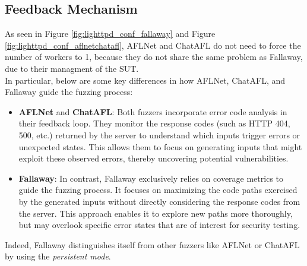 \subsection{Feedback Mechanism}
As seen in Figure \ref{fig:lighttpd_conf_fallaway} and Figure \ref{fig:lighttpd_conf_aflnetchatafl}, AFLNet and ChatAFL do not need to force the number of workers to 1, because they do not share the same problem as Fallaway, due to their managment of the SUT.
\\In particular, below are some key differences in how AFLNet, ChatAFL, and Fallaway guide the fuzzing process:

\begin{itemize}
    \item \textbf{AFLNet} and \textbf{ChatAFL}: Both fuzzers incorporate error code analysis in their feedback loop. They monitor the response codes (such as HTTP 404, 500, etc.) returned by the server to understand which inputs trigger errors or unexpected states. This allows them to focus on generating inputs that might exploit these observed errors, thereby uncovering potential vulnerabilities.
    \item \textbf{Fallaway}: In contrast, Fallaway exclusively relies on coverage metrics to guide the fuzzing process. It focuses on maximizing the code paths exercised by the generated inputs without directly considering the response codes from the server. This approach enables it to explore new paths more thoroughly, but may overlook specific error states that are of interest for security testing.
\end{itemize}
Indeed, Fallaway distinguishes itself from other fuzzers like AFLNet or ChatAFL by using the \textit{persistent mode}.
